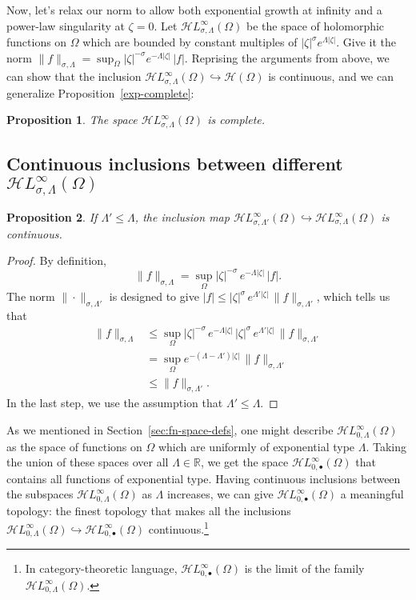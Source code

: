 \documentclass{article}
\theoremstyle{plain}
\newtheorem{prop}{Proposition}
\newcommand{\R}{\mathbb{R}}
\newcommand{\holo}{\mathcal{H}}
\newcommand{\singexp}[2]{\mathcal{H}L^\infty_{#1, #2}}
\newcommand{\singexpalg}[1]{\singexp{#1}{\bullet}}
\newcommand{\domain}{\Omega}
\begin{document}
Now, let's relax our norm to allow both exponential growth at infinity and a power-law singularity at $\zeta = 0$. Let $\singexp{\sigma}{\Lambda}(\Omega)$ be the space of holomorphic functions on $\Omega$ which are bounded by constant multiples of $|\zeta|^\sigma e^{\Lambda|\zeta|}$. Give it the norm $\|f\|_{\sigma,\Lambda} = \sup_\Omega |\zeta|^{-\sigma} e^{-\Lambda|\zeta|}\,|f|$. Reprising the arguments from above, we can show that the inclusion $\singexp{\sigma}{\Lambda}(\Omega) \hookrightarrow \holo(\Omega)$ is continuous, and we can generalize Proposition~\ref{exp-complete}:
\begin{prop}
The space $\singexp{\sigma}{\Lambda}(\Omega)$ is complete.
\end{prop}
\subsection{Continuous inclusions between different $\singexp{\sigma}{\Lambda}(\Omega)$}\label{sec:inclusions}
\begin{prop}\label{prop:inclus-ge-exp}
If $\Lambda'\leq\Lambda$, the inclusion map $\singexp{\sigma}{\Lambda'}(\Omega)\hookrightarrow \singexp{\sigma}{\Lambda}(\Omega)$ is continuous.
\end{prop}
\begin{proof}
By definition,
\[ \|f\|_{\sigma,\Lambda}=\sup_{\Omega} |\zeta|^{-\sigma}\,e^{-\Lambda |\zeta|}\, |f|. \]
The norm $\|\cdot\|_{\sigma, \Lambda'}$ is designed to give $|f| \le |\zeta|^\sigma\,e^{\Lambda'|\zeta|}\,\|f\|_{\sigma, \Lambda'}$, which tells us that
\begin{align*}
\|f\|_{\sigma,\Lambda} & \leq \sup_{\Omega} |\zeta|^{-\sigma}\,e^{-\Lambda |\zeta|}\,|\zeta|^\sigma\,e^{\Lambda'|\zeta|}\,\|f\|_{\sigma, \Lambda'}\\
&=\sup_{\Omega} e^{-(\Lambda-\Lambda') |\zeta|}\,\|f\|_{\sigma, \Lambda'}\\
&\leq \|f\|_{\sigma,\Lambda'}.
\end{align*}
In the last step, we use the assumption that $\Lambda' \le \Lambda$.
\end{proof}
As we mentioned in Section~\ref{sec:fn-space-defs}, one might describe $\singexp{0}{\Lambda}(\domain)$ as the space of functions on $\domain$ which are uniformly of exponential type $\Lambda$. Taking the union of these spaces over all $\Lambda \in \R$, we get the space $\singexpalg{0}(\domain)$ that contains all functions of exponential type. Having continuous inclusions between the subspaces $\singexp{0}{\Lambda}(\domain)$ as $\Lambda$ increases, we can give $\singexpalg{0}(\domain)$ a meaningful topology: the finest topology that makes all the inclusions $\singexp{0}{\Lambda}(\domain) \hookrightarrow \singexpalg{0}(\domain)$ continuous.\footnote{In category-theoretic language, $\singexpalg{0}(\domain)$ is the limit of the family $\singexp{0}{\Lambda}(\domain)$.}
\end{document}
